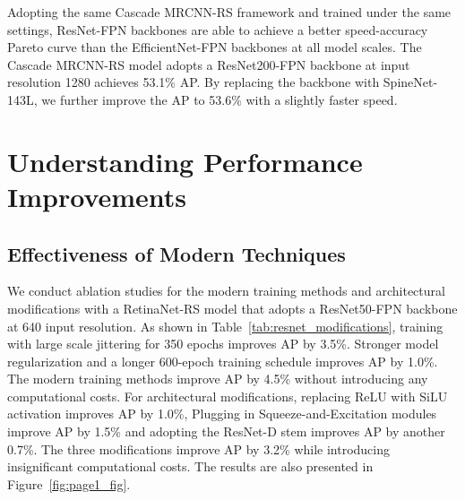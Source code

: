 \documentclass[final]{cvpr}
\begin{document}
Adopting the same Cascade MRCNN-RS framework and trained under the same settings, ResNet-FPN backbones are able to achieve a better speed-accuracy Pareto curve than the EfficientNet-FPN backbones at all model scales. The Cascade MRCNN-RS model adopts a ResNet200-FPN backbone at input resolution 1280 achieves 53.1\% AP. By replacing the backbone with SpineNet-143L, we further improve the AP to 53.6\% with a slightly faster speed.

\section{Understanding Performance Improvements}
\subsection{Effectiveness of Modern Techniques}
We conduct ablation studies for the modern training methods and architectural modifications with a RetinaNet-RS model that adopts a ResNet50-FPN backbone at 640 input resolution. As shown in Table~\ref{tab:resnet_modifications}, training with large scale jittering for 350 epochs improves AP by 3.5\%. Stronger model regularization and a longer 600-epoch training schedule improves AP by 1.0\%. The modern training methods improve AP by 4.5\% without introducing any computational costs. For architectural modifications, replacing ReLU with SiLU activation improves AP by 1.0\%, Plugging in Squeeze-and-Excitation modules improve AP by 1.5\% and adopting the ResNet-D stem improves AP by another 0.7\%. The three modifications improve AP by 3.2\% while introducing insignificant computational costs. The results are also presented in Figure~\ref{fig:page1_fig}.
\end{document}
